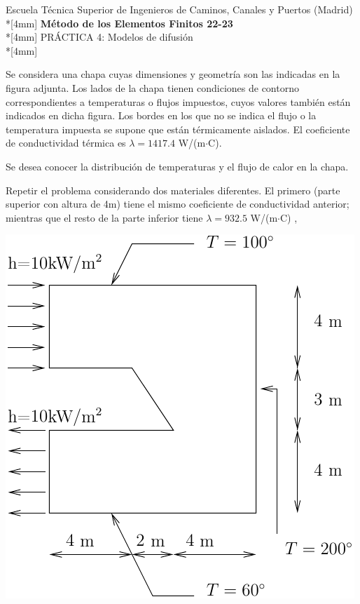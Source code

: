 \documentclass[a4paper,12pt]{article}
\begin{document}
\mbox{}\vspace*{-45mm}

{\centering
{\small\sc Escuela Técnica Superior de Ingenieros de Caminos, Canales y
Puertos (Madrid)}\\*[4mm]
{\Large\bf Método de los Elementos Finitos 22-23}\\*[4mm]
PRÁCTICA 4: Modelos de difusión \\*[4mm]
}

\vspace{3mm}

\parbox{70mm}{ 
Se considera una chapa cuyas dimensiones y geometría son las indicadas
en la figura adjunta. Los lados de la chapa tienen condiciones de contorno 
correspondientes a temperaturas o flujos impuestos, cuyos valores
también están indicados en dicha figura. Los bordes en los que no se indica
el flujo o la temperatura impuesta se supone que están térmicamente aislados.
El coeficiente de conductividad térmica es $\lambda=1417.4$ W/(m$\cdot$C).

Se desea conocer la distribución de temperaturas y el flujo de calor en la
chapa.

Repetir el problema considerando dos materiales diferentes. El primero (parte superior con altura de 4m) tiene el mismo coeficiente de conductividad anterior; mientras que el resto de la parte inferior tiene $\lambda=932.5$ W/(m$\cdot$C) , 
} \hfill
\parbox{80mm}{
\includegraphics{practi4}
}
\end{document}
